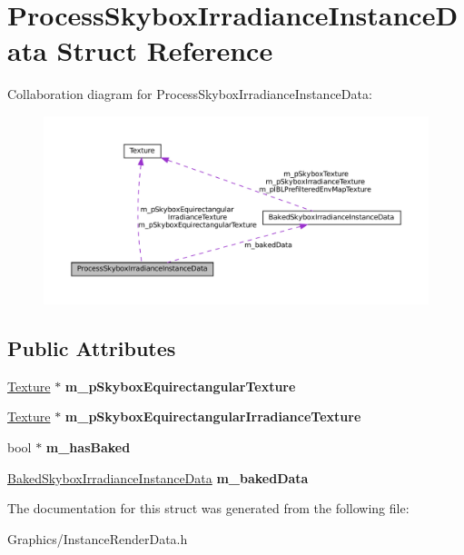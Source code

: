 \hypertarget{structProcessSkyboxIrradianceInstanceData}{}\section{Process\+Skybox\+Irradiance\+Instance\+Data Struct Reference}
\label{structProcessSkyboxIrradianceInstanceData}


Collaboration diagram for Process\+Skybox\+Irradiance\+Instance\+Data\+:
\nopagebreak
\begin{figure}[H]
\begin{center}
\leavevmode
\includegraphics[width=350pt]{structProcessSkyboxIrradianceInstanceData__coll__graph}
\end{center}
\end{figure}
\subsection*{Public Attributes}
\begin{DoxyCompactItemize}
\item 
\mbox{\label{structProcessSkyboxIrradianceInstanceData_a9e88265931246132b871d757139bbb99}} 
\hyperlink{classTexture}{Texture} $\ast$ {\bfseries m\+\_\+p\+Skybox\+Equirectangular\+Texture}
\item 
\mbox{\label{structProcessSkyboxIrradianceInstanceData_a97f81f12e7c3ff57fa3c93b3076cb85d}} 
\hyperlink{classTexture}{Texture} $\ast$ {\bfseries m\+\_\+p\+Skybox\+Equirectangular\+Irradiance\+Texture}
\item 
\mbox{\label{structProcessSkyboxIrradianceInstanceData_a4410a7f7a0c627abee935f730bff0007}} 
bool $\ast$ {\bfseries m\+\_\+has\+Baked}
\item 
\mbox{\label{structProcessSkyboxIrradianceInstanceData_aedc9dac38523c921586e4851dfdc0e91}} 
\hyperlink{structBakedSkyboxIrradianceInstanceData}{Baked\+Skybox\+Irradiance\+Instance\+Data} {\bfseries m\+\_\+baked\+Data}
\end{DoxyCompactItemize}


The documentation for this struct was generated from the following file\+:\begin{DoxyCompactItemize}
\item 
Graphics/Instance\+Render\+Data.\+h\end{DoxyCompactItemize}
